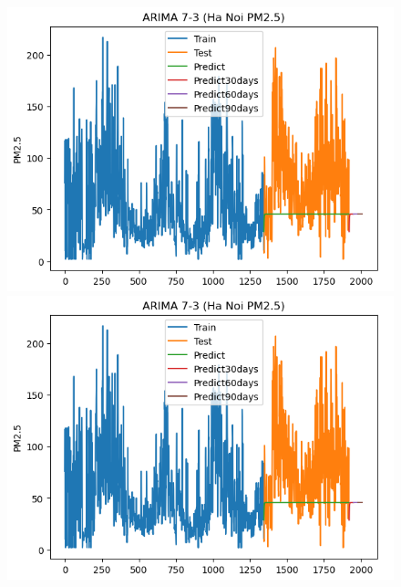 \begin{figure}[H]
    \begin{minipage}{0.15\textwidth}
    \centering
    \includegraphics[width=1\textwidth]{img/final/ARIMA/90D/ARIMA_7_3_HN.png}
    \end{minipage}
    \hfill
    \begin{minipage}{0.15\textwidth}
    \centering
    \includegraphics[width=1\textwidth]{img/final/ARIMA/90D/ARIMA_7_3_HN.png}
    \end{minipage}
    \hfill
    \begin{minipage}{0.15\textwidth}
    \centering

\end{minipage}
\end{figure}

